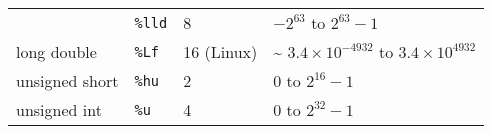 \documentclass[
]{article}
\begin{document}
\begin{longtable}[]{@{}llll@{}}
\begin{minipage}[t]{0.14\columnwidth}
\end{minipage} & \begin{minipage}[t]{0.13\columnwidth}\raggedright
\texttt{\%lld}\strut
\end{minipage} & \begin{minipage}[t]{0.19\columnwidth}\raggedright
8\strut
\end{minipage} & \begin{minipage}[t]{0.43\columnwidth}\raggedright
\(-2^{63}\) to \(2^{63}-1\)\strut
\end{minipage}\tabularnewline
\begin{minipage}[t]{0.14\columnwidth}\raggedright
long double\strut
\end{minipage} & \begin{minipage}[t]{0.13\columnwidth}\raggedright
\texttt{\%Lf}\strut
\end{minipage} & \begin{minipage}[t]{0.19\columnwidth}\raggedright
16 (Linux)\strut
\end{minipage} & \begin{minipage}[t]{0.43\columnwidth}\raggedright
\textasciitilde{} \(3.4 \times 10^{-4932}\) to
\(3.4 \times 10^{4932}\)\strut
\end{minipage}\tabularnewline
\begin{minipage}[t]{0.14\columnwidth}\raggedright
unsigned short\strut
\end{minipage} & \begin{minipage}[t]{0.13\columnwidth}\raggedright
\texttt{\%hu}\strut
\end{minipage} & \begin{minipage}[t]{0.19\columnwidth}\raggedright
2\strut
\end{minipage} & \begin{minipage}[t]{0.43\columnwidth}\raggedright
0 to \(2^{16}-1\)\strut
\end{minipage}\tabularnewline
\begin{minipage}[t]{0.14\columnwidth}\raggedright
unsigned int\strut
\end{minipage} & \begin{minipage}[t]{0.13\columnwidth}\raggedright
\texttt{\%u}\strut
\end{minipage} & \begin{minipage}[t]{0.19\columnwidth}\raggedright
4\strut
\end{minipage} & \begin{minipage}[t]{0.43\columnwidth}\raggedright
0 to \(2^{32}-1\)\strut
\end{minipage}\tabularnewline

\end{longtable}
\end{document}
